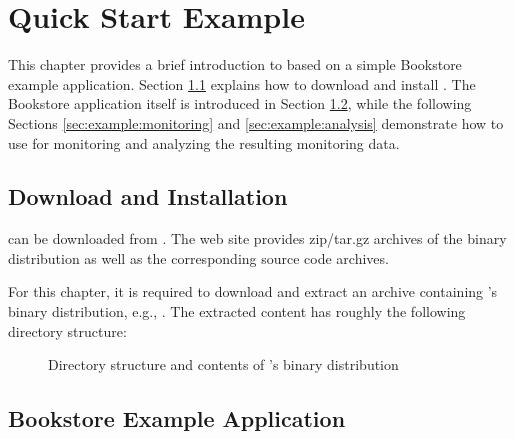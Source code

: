 \chapter{Quick Start Example}

This chapter provides a brief introduction to \Kieker{} based on a simple Bookstore example application. %
Section \ref{sec:example:downloadInstall} explains how to download and install \Kieker{}. The Bookstore application itself is introduced in Section \ref{sec:example:bookstore}, while the following Sections \ref{sec:example:monitoring} and \ref{sec:example:analysis} demonstrate how to use \Kieker{} for monitoring and analyzing the resulting monitoring data.

\section{Download and Installation}\label{sec:example:downloadInstall}

\Kieker{} can be downloaded from \KiekerURL. The web site provides zip/tar.gz archives of the \Kieker{} binary distribution as well as the corresponding \Kieker{} source code archives.

For this chapter, it is required to download and extract an archive containing \Kieker's binary distribution, e.g., \file{\binaryFileForDownload}. The extracted content has roughly the following directory structure:
\begin{figure}[H]
\begin{graybox}
\end{graybox}
\caption{Directory structure and contents of \Kieker{}'s binary distribution}
\end{figure}

\section{Bookstore Example Application}\label{sec:example:bookstore}

